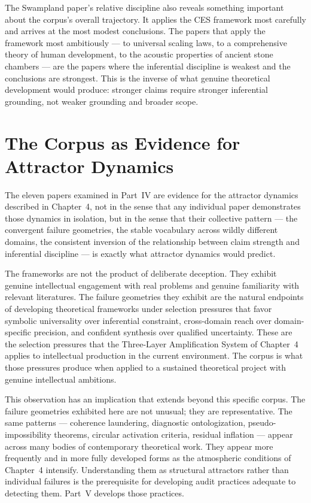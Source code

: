 \documentclass[12pt, openright, twoside]{book}
\begin{document}
The Swampland paper's relative discipline also reveals something important
about the corpus's overall trajectory. It applies the CES framework most
carefully and arrives at the most modest conclusions. The papers that apply
the framework most ambitiously --- to universal scaling laws, to a comprehensive
theory of human development, to the acoustic properties of ancient stone
chambers --- are the papers where the inferential discipline is weakest and
the conclusions are strongest. This is the inverse of what genuine theoretical
development would produce: stronger claims require stronger inferential grounding,
not weaker grounding and broader scope.

\section{The Corpus as Evidence for Attractor Dynamics}

The eleven papers examined in Part~IV are evidence for the attractor dynamics
described in Chapter~4, not in the sense that any individual paper demonstrates
those dynamics in isolation, but in the sense that their collective pattern ---
the convergent failure geometries, the stable vocabulary across wildly different
domains, the consistent inversion of the relationship between claim strength
and inferential discipline --- is exactly what attractor dynamics would predict.

The frameworks are not the product of deliberate deception. They exhibit
genuine intellectual engagement with real problems and genuine familiarity
with relevant literatures. The failure geometries they exhibit are the natural
endpoints of developing theoretical frameworks under selection pressures that
favor symbolic universality over inferential constraint, cross-domain reach
over domain-specific precision, and confident synthesis over qualified uncertainty.
These are the selection pressures that the Three-Layer Amplification System
of Chapter~4 applies to intellectual production in the current environment.
The corpus is what those pressures produce when applied to a sustained
theoretical project with genuine intellectual ambitions.

This observation has an implication that extends beyond this specific corpus.
The failure geometries exhibited here are not unusual; they are representative.
The same patterns --- coherence laundering, diagnostic ontologization, pseudo-
impossibility theorems, circular activation criteria, residual inflation ---
appear across many bodies of contemporary theoretical work. They appear more
frequently and in more fully developed forms as the atmospheric conditions
of Chapter~4 intensify. Understanding them as structural attractors rather
than individual failures is the prerequisite for developing audit practices
adequate to detecting them. Part~V develops those practices.
\end{document}
